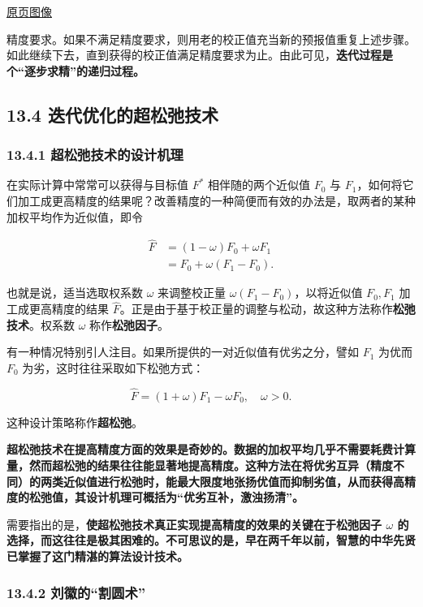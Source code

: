\documentclass[
  10pt,
  fontset=fandol]{ctexart}
\begin{document}
\href{../../source-images/pdf-313.jpeg}{原页图像}

精度要求。如果不满足精度要求，则用老的校正值充当新的预报值重复上述步骤。如此继续下去，直到获得的校正值满足精度要求为止。由此可见，\textbf{迭代过程是个``逐步求精''的递归过程。}

\subsection{13.4 迭代优化的超松弛技术}\label{ux8fedux4ee3ux4f18ux5316ux7684ux8d85ux677eux5f1bux6280ux672f}

\subsubsection{13.4.1 超松弛技术的设计机理}\label{ux8d85ux677eux5f1bux6280ux672fux7684ux8bbeux8ba1ux673aux7406}

在实际计算中常常可以获得与目标值 \(F^*\) 相伴随的两个近似值 \(F_0\) 与 \(F_1\)，如何将它们加工成更高精度的结果呢？改善精度的一种简便而有效的办法是，取两者的某种加权平均作为近似值，即令

\[
\begin{aligned}
\widehat F&=(1-\omega)F_0+\omega F_1\\
&=F_0+\omega(F_1-F_0).
\end{aligned}
\]

也就是说，适当选取权系数 \(\omega\) 来调整校正量 \(\omega(F_1-F_0)\)，以将近似值 \(F_0,F_1\) 加工成更高精度的结果 \(\widehat F\)。正是由于基于校正量的调整与松动，故这种方法称作\textbf{松弛技术}。权系数 \(\omega\) 称作\textbf{松弛因子}。

有一种情况特别引人注目。如果所提供的一对近似值有优劣之分，譬如 \(F_1\) 为优而 \(F_0\) 为劣，这时往往采取如下松弛方式：

\[
\widehat F=(1+\omega)F_1-\omega F_0,\quad\omega>0.
\]

这种设计策略称作\textbf{超松弛}。

\textbf{超松弛技术在提高精度方面的效果是奇妙的。数据的加权平均几乎不需要耗费计算量，然而超松弛的结果往往能显著地提高精度。这种方法在将优劣互异（精度不同）的两类近似值进行松弛时，能最大限度地张扬优值而抑制劣值，从而获得高精度的松弛值，其设计机理可概括为``优劣互补，激浊扬清''。}

需要指出的是，\textbf{使超松弛技术真正实现提高精度的效果的关键在于松弛因子 \(\omega\) 的选择，而这往往是极其困难的。不可思议的是，早在两千年以前，智慧的中华先贤已掌握了这门精湛的算法设计技术。}

\subsubsection{13.4.2 刘徽的``割圆术''}\label{ux5218ux5fbdux7684ux5272ux5706ux672f}
\end{document}
